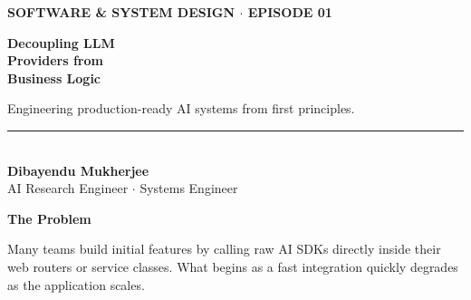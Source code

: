 \documentclass[11pt]{article}
\begin{document}
\thispagestyle{empty}
\vspace*{0.8in}
\begin{center}
    
    {\fontsize{14}{16}\selectfont\color{brandblue}\textbf{SOFTWARE \& SYSTEM DESIGN \quad $\cdot$ \quad EPISODE 01}}
    
    \vspace{0.8in}
    
    {\fontsize{42}{50}\selectfont\color{brandnavy}\bfseries Decoupling LLM\\Providers from\\Business Logic}
    
    \vspace{0.6in}
    
    {\fontsize{18}{24}\selectfont\color{brandgray}Engineering production-ready AI systems from first principles.}
    
    \vfill
    
    \begin{minipage}{0.8\textwidth}
        \centering
        \rule{0.6\linewidth}{0.5pt} \\
        \vspace{0.2in}
        {\fontsize{12}{14}\selectfont\color{brandnavy}\textbf{Dibayendu Mukherjee}} \\
        \vspace{0.05in}
        {\fontsize{10}{12}\selectfont\color{brandgray}AI Research Engineer \quad $\cdot$ \quad Systems Engineer}
    \end{minipage}
    
\end{center}
\newpage


\vspace*{1.8in}

\begin{center}
{\fontsize{26}{30}\selectfont\color{brandnavy}\bfseries The Problem}
\end{center}

\vspace{0.4in}

Many teams build initial features by calling raw AI SDKs directly inside their web routers or service classes. What begins as a fast integration quickly degrades as the application scales.
\end{document}
